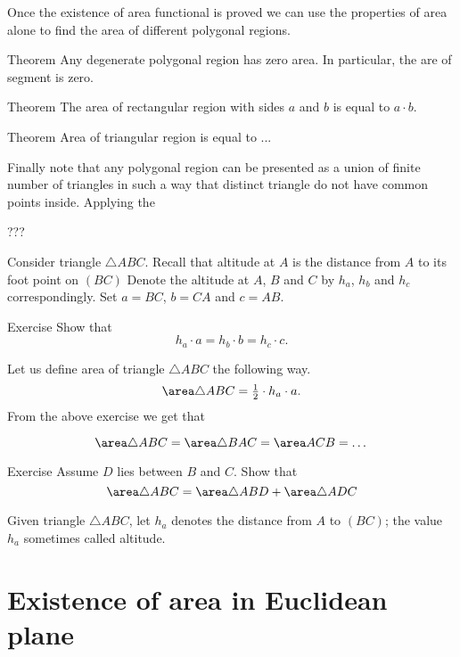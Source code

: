 {Once the existence of area functional is proved we can use the properties of area alone to find the area of different polygonal regions.

\begin{thm}{Theorem}
Any degenerate polygonal region has zero area.
In particular, the are of segment is zero.
\end{thm}


\begin{thm}{Theorem}
The area of rectangular region with sides $a$ and $b$ is equal to $a\cdot b$. 
\end{thm}


\begin{thm}{Theorem}
Area of triangular region is equal to ...
\end{thm}

Finally note that any polygonal region can be presented as a union of finite number of triangles in such a way that distinct triangle do not have common points inside.
Applying the 

???

Consider triangle $\triangle ABC$.
Recall that altitude at $A$ is the distance from $A$ to its foot point on $(BC)$
Denote the altitude at $A$, $B$ and $C$ by $h_a$, $h_b$ and $h_c$ correspondingly.
Set $a=BC$, $b=CA$ and $c=AB$.

\begin{thm}{Exercise}
Show that 
$$h_a\cdot a=h_b\cdot b=h_c\cdot c.$$
\end{thm}


Let us define area of triangle $\triangle ABC$ the following way.
$$\area \triangle ABC= \tfrac12\cdot h_a\cdot a.
$$
From the above exercise we get that 

$$\area \triangle ABC=\area \triangle BAC=\area ACB=\dots$$


\begin{thm}{Exercise}
Assume $D$ lies between $B$ and $C$.
Show that 
$$\area \triangle ABC=\area \triangle ABD+\area \triangle ADC$$
\end{thm}

Given triangle $\triangle ABC$, let 
$h_a$ denotes the distance from $A$ to $(BC)$;
the value $h_a$ sometimes called altitude. 



\section*{Existence of area in Euclidean plane}

}
